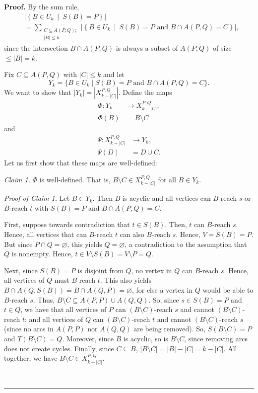 \documentclass[numbers=enddot,12pt,final,onecolumn,notitlepage]{scrartcl}%
\theoremstyle{definition}
\newenvironment{proof}[1][Proof]{\noindent\textbf{#1.} }{\ \rule{0.5em}{0.5em}}
\let\sumnonlimits\sum
\renewcommand{\sum}{\sumnonlimits\limits}
\theoremstyle{plainsl}
\begin{document}
\begin{proof}
    By the sum rule,
	\begin{align*}
&  \left\vert \left\{  B\in U_{k}\ \mid\ S\left(  B\right)  =P\right\}
\right\vert \\
&  =\sum_{\substack{C\subseteq A\left(  P,Q\right); \\ \left|B\right| \leq k}}
\left\vert \left\{  B\in
U_{k}\ \mid\ S\left(  B\right)  =P\text{ and }B\cap A\left(  P,Q\right)
=C\right\}  \right\vert ,
\end{align*}
since the intersection $B\cap A\left(  P,Q\right)  $ is always a subset of
$A\left(  P,Q\right)  $ of size $\leq \left|B\right| = k$.

Fix $C \subseteq A(P,Q)$ with $|C| \leq k$ and let \begin{equation*}
    Y_k = \{B \in U_{k} \mid  S(B) = P \text{ and } B \cap A(P,Q) = C\}.
\end{equation*}
We want to show that $|Y_k| = |X_{k-|C|}^{P,Q}|$. Define the maps
 \begin{align*}
    \Phi : Y_k &\to X_{k-|C|}^{P,Q}, \\
	\Phi(B) &= B \setminus C
 \end{align*}
 and
 \begin{align*}
    \Psi : X_{k-|C|}^{P,Q} &\to Y_{k}, \\
	\Psi(D) &= D \cup C.
 \end{align*}
Let us first show that these maps are well-defined:

\textit{Claim 1.} $\Phi$ is well-defined. That is, $B \setminus C \in X_{k-|C|}^{P,Q}$ for all $B \in Y_{k}$.

\smallskip
\textit{Proof of Claim 1.} Let $B \in Y_{k}$. Then $B$ is acyclic and all vertices can $B$-reach $s$ or $B$-reach $t$ with $S(B) = P$ and $B \cap A(P,Q) = C$.

First, suppose towards contradiction that $t \in S(B)$. Then, $t$ can $B$-reach $s$. Hence, all vertices that can $B$-reach $t$ can also $B$-reach $s$. Hence, $V = S(B) = P$. But since $P \cap Q = \varnothing$, this yields $Q = \varnothing$, a contradiction to the assumption that $Q$ is nonempty. Hence, $t \in V \setminus S(B) = V \setminus P = Q$. 

Next, since $S(B) = P$ is disjoint from $Q$, no vertex in $Q$ can $B$-reach $s$. Hence, all vertices of $Q$ must $B$-reach $t$. This also yields $B \cap A(Q,S(B)) = B \cap A(Q,P) = \varnothing$, for else a vertex in $Q$ would be able to $B$-reach $s$. Thus, $B \setminus C \subseteq A(P,P) \cup A(Q,Q)$. So, since $s \in S(B) = P$ and $t \in Q$, we have that all vertices of $P$ can $(B \setminus C)$-reach $s$ and cannot $(B \setminus C)$-reach $t$; and all vertices of $Q$ can $(B \setminus C)$-reach $t$ and cannot $(B \setminus C)$-reach $s$ (since no arcs in $A(P,P)$ nor $A(Q,Q)$ are being removed). So, $S(B \setminus C) = P$ and $T(B \setminus C) = Q$. Moreover, since $B$ is acyclic, so is $B \setminus C$, since removing arcs does not create cycles. Finally, since $C \subseteq B$, $|B \setminus C| = |B|-|C| = k-|C|$. All together, we have $B \setminus C \in X_{k-|C|}^{P,Q}$.


\end{proof}
\end{document}
